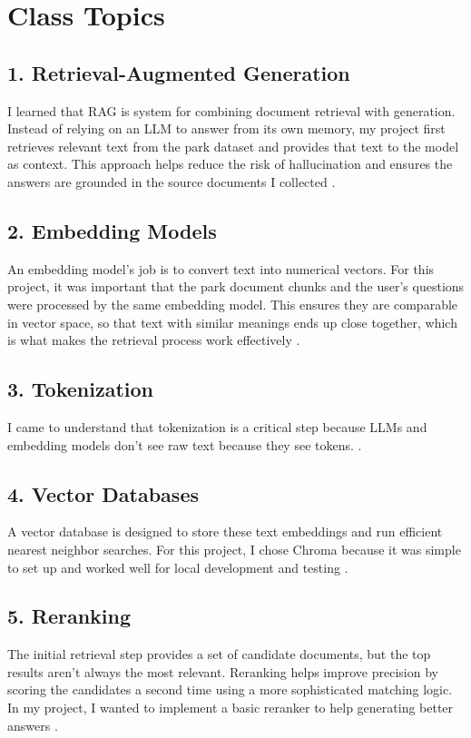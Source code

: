 \documentclass[11pt]{article}
\begin{document}
\section{Class Topics}

\subsection{1. Retrieval-Augmented Generation}
I learned that RAG is system for combining document retrieval with generation. Instead of relying on an LLM to answer from its own memory, my project first retrieves relevant text from the park dataset and provides that text to the model as context. This approach helps reduce the risk of hallucination and ensures the answers are grounded in the source documents I collected \cite{rag_lecture}.

\subsection{2. Embedding Models}
An embedding model's job is to convert text into numerical vectors. For this project, it was important that the park document chunks and the user's questions were processed by the same embedding model. This ensures they are comparable in vector space, so that text with similar meanings ends up close together, which is what makes the retrieval process work effectively \cite{embeddings_lecture}.

\subsection{3. Tokenization}
I came to understand that tokenization is a critical step because LLMs and embedding models don't see raw text because they see tokens. \cite{tokenization_lecture}.

\subsection{4. Vector Databases}
A vector database is designed to store these text embeddings and run efficient nearest neighbor searches. For this project, I chose Chroma because it was simple to set up and worked well for local development and testing \cite{vectordb_lecture}.

\subsection{5. Reranking}
The initial retrieval step provides a set of candidate documents, but the top results aren't always the most relevant. Reranking helps improve precision by scoring the candidates a second time using a more sophisticated matching logic. In my project, I wanted to implement a basic reranker to help generating better answers \cite{reranking_lecture}.
\end{document}

